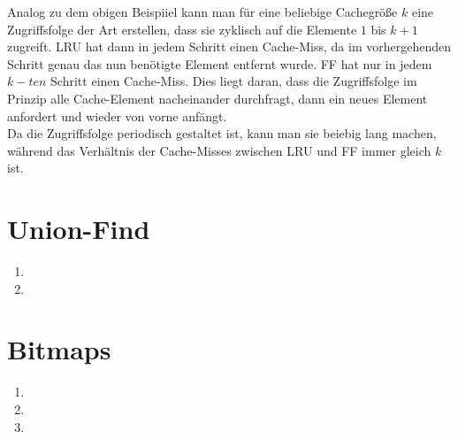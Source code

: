 \documentclass[a4paper,10pt]{article}
\begin{document}
\begin{enumerate}
Analog zu dem obigen Beispiiel kann man für eine beliebige Cachegröße $k$ eine Zugriffsfolge der Art erstellen, dass sie zyklisch auf die Elemente $1$ bis $k+1$ zugreift. LRU hat dann in jedem Schritt einen Cache-Miss, da im vorhergehenden Schritt genau das nun benötigte Element entfernt wurde. FF hat nur in jedem $k-ten$ Schritt einen Cache-Miss. Dies liegt daran, dass die Zugriffsfolge im Prinzip alle Cache-Element nacheinander durchfragt, dann ein neues Element anfordert und wieder von vorne anfängt.\\
Da die Zugriffsfolge periodisch gestaltet ist, kann man sie beiebig lang machen, während das Verhältnis der Cache-Misses zwischen LRU und FF immer gleich $k$ ist. 

\end{enumerate}

\section{Union-Find}
\begin{enumerate}
\item 
\item 
\end{enumerate}

\section{Bitmaps}
\begin{enumerate}
\item 
\item
\item
\end{enumerate}
\end{document}
